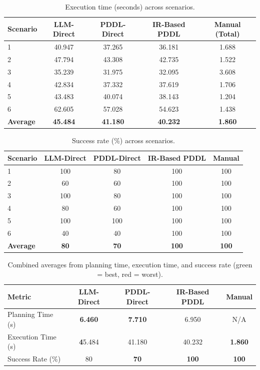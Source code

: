 \documentclass[12pt]{extarticle}
\begin{document}
\begin{table}[h]
\centering
\small
\caption{Execution time (seconds) across scenarios.}
\label{tab:overall-execution-time}
\begin{tabular}{lcccc}
\toprule
\textbf{Scenario} & \textbf{LLM-Direct} & \textbf{PDDL-Direct} & \textbf{IR-Based PDDL} & \textbf{Manual (Total)} \\
\midrule
1 & 40.947 & 37.265 & 36.181 & 1.688 \\
2 & 47.794 & 43.308 & 42.735 & 1.522 \\
3 & 35.239 & 31.975 & 32.095 & 3.608 \\
4 & 42.834 & 37.332 & 37.619 & 1.706 \\
5 & 43.483 & 40.074 & 38.143 & 1.204 \\
6 & 62.605 & 57.028 & 54.623 & 1.438 \\
\midrule
\textbf{Average} & \textbf{45.484} & \textbf{41.180} & \textbf{40.232} & \textbf{1.860} \\
\bottomrule
\end{tabular}
\end{table}

\begin{table}[h]
\centering
\small
\caption{Success rate (\%) across scenarios.}
\label{tab:overall-success-rate}
\begin{tabular}{lcccc}
\toprule
\textbf{Scenario} & \textbf{LLM-Direct} & \textbf{PDDL-Direct} & \textbf{IR-Based PDDL} & \textbf{Manual} \\
\midrule
1 & 100 & 80 & 100 & 100 \\
2 & 60 & 60 & 100 & 100 \\
3 & 100 & 80 & 100 & 100 \\
4 & 80 & 60 & 100 & 100 \\
5 & 100 & 100 & 100 & 100 \\
6 & 40 & 40 & 100 & 100 \\
\midrule
\textbf{Average} & \textbf{80} & \textbf{70} & \textbf{100} & \textbf{100} \\
\bottomrule
\end{tabular}
\end{table}

\begin{table}[h]
\centering
\small
\caption{Combined averages from planning time, execution time, and success rate (green = best, red = worst).}
\label{tab:overall-combined-averages}
\begin{tabular}{lcccc}
\toprule
\textbf{Metric} & \textbf{LLM-Direct} & \textbf{PDDL-Direct} & \textbf{IR-Based PDDL} & \textbf{Manual} \\
\midrule
Planning Time (s) & \textcolor{green!50!black}{\textbf{6.460}} & \textcolor{red!70!black}{\textbf{7.710}} & 6.950 & N/A \\
Execution Time (s) & \textcolor{red!70!black!}{\textbf45.484} & 41.180 & 40.232 & \textcolor{green!50!black}{\textbf{1.860}} \\
Success Rate (\%) & 80 & \textcolor{red!70!black}{\textbf{70}} & \textcolor{green!50!black}{\textbf{100}} & \textcolor{green!50!black}{\textbf{100}} \\
\bottomrule
\end{tabular}
\end{table}
\end{document}
